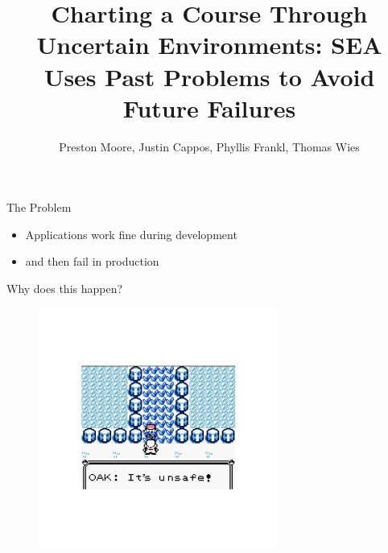 \documentclass[pdf]{beamer}
\title[The SEA Technique]{Charting a Course Through Uncertain Environments: SEA Uses Past
Problems to Avoid Future Failures}
\author[Moore, Cappos, Frankl, Wies]{Preston Moore, Justin Cappos, Phyllis Frankl, Thomas Wies}
\begin{document}



\begin{frame}
  \titlepage{}
\end{frame}


\begin{frame}{The Problem}
  \begin{itemize}
    \item{Applications work fine during development}
    \item{and then fail in production}
  \end{itemize}
\end{frame}


\begin{frame}{Why does this happen?}
  \begin{figure}
    \centering
    \includegraphics[width = 0.7\textwidth]{images/dangerous}
  \end{figure}
\end{frame}



\end{document}
